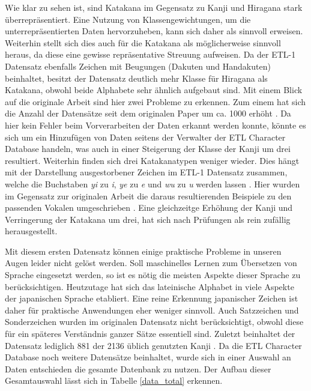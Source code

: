 \documentclass[twoside,a4paper]{IEEEtran}
\begin{document}
Wie klar zu sehen ist, sind Katakana im Gegensatz zu Kanji und Hiragana stark überrepräsentiert. Eine Nutzung von Klassengewichtungen, um die unterrepräsentierten Daten hervorzuheben, kann sich daher als sinnvoll erweisen. Weiterhin stellt sich dies auch für die Katakana als möglicherweise sinnvoll heraus, da diese eine gewisse repräsentative Streuung aufweisen. Da der ETL-1 Datensatz ebenfalls Zeichen mit Beugungen (Dakuten und Handakuten) beinhaltet, besitzt der Datensatz deutlich mehr Klasse für Hiragana als Katakana, obwohl beide Alphabete sehr ähnlich aufgebaut sind. Mit einem Blick auf die originale Arbeit sind hier zwei Probleme zu erkennen. Zum einem hat sich die Anzahl der Datensätze seit dem originalen Paper um ca. 1000 erhöht \cite[S.3]{RHC}. Da hier kein Fehler beim Vorverarbeiten der Daten erkannt werden konnte, könnte es sich um ein Hinzufügen von Daten seitens der Verwalter der ETL Character Database handeln, was auch in einer Steigerung der Klasse der Kanji um drei resultiert. Weiterhin finden sich drei Katakanatypen weniger wieder. Dies hängt mit der Darstellung ausgestorbener Zeichen im ETL-1 Datensatz zusammen, welche die Buchstaben \textit{yi} zu \textit{i}, \textit{ye} zu \textit{e} und \textit{wu} zu \textit{u} werden lassen \cite{ETL}. Hier wurden im Gegensatz zur originalen Arbeit die daraus resultierenden Beispiele zu den passenden Vokalen umgeschrieben \cite[S.3]{RHC}. Eine gleichzeitge Erhöhung der Kanji und Verringerung der Katakana um drei, hat sich nach Prüfungen als rein zufällig herausgestellt. 

Mit diesem ersten Datensatz können einige praktische Probleme in unseren Augen leider nicht gelöst werden. Soll  maschinelles Lernen zum Übersetzen von Sprache eingesetzt werden, so ist es nötig die meisten Aspekte dieser Sprache zu berücksichtigen. Heutzutage hat sich das lateinische Alphabet in viele Aspekte der japanischen Sprache etabliert. Eine reine Erkennung japanischer Zeichen ist daher für praktische Anwendungen eher weniger sinnvoll. Auch Satzzeichen und Sonderzeichen wurden im originalen Datensatz nicht berücksichtigt, obwohl diese für ein späteres Verständnis ganzer Sätze essentiell sind. Zuletzt beinhaltet der Datensatz lediglich 881 der 2136 üblich genutzten Kanji \cite[S.3]{RHC}. Da die ETL Character Database noch weitere Datensätze beinhaltet, wurde sich in einer Auswahl an Daten entschieden die gesamte Datenbank zu nutzen. Der Aufbau dieser Gesamtauswahl lässt sich in Tabelle \ref{data_total} erkennen.
\end{document}

